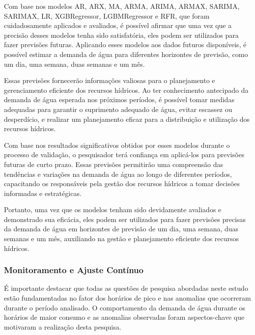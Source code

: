 Com base nos modelos AR, ARX, MA, ARMA, ARIMA, ARMAX, SARIMA, SARIMAX, LR, XGBRegressor, LGBMRegressor e RFR, que foram cuidadosamente aplicados e avaliados, é possível afirmar que uma vez que a precisão desses modelos tenha sido satisfatória, eles podem ser utilizados para fazer previsões futuras. Aplicando esses modelos aos dados futuros disponíveis, é possível estimar a demanda de água para diferentes horizontes de previsão, como um dia, uma semana, duas semanas e um mês.

Essas previsões fornecerão informações valiosas para o planejamento e gerenciamento eficiente dos recursos hídricos. Ao ter conhecimento antecipado da demanda de água esperada nos próximos períodos, é possível tomar medidas adequadas para garantir o suprimento adequado de água, evitar escassez ou desperdício, e realizar um planejamento eficaz para a distribuição e utilização dos recursos hídricos.

Com base nos resultados significativos obtidos por esses modelos durante o processo de validação, o pesquisador terá confiança em aplicá-los para previsões futuras de curto prazo. Essas previsões permitirão uma compreensão das tendências e variações na demanda de água ao longo de diferentes períodos, capacitando os responsáveis pela gestão dos recursos hídricos a tomar decisões informadas e estratégicas.

Portanto, uma vez que os modelos tenham sido devidamente avaliados e demonstrado sua eficácia, eles podem ser utilizados para fazer previsões precisas da demanda de água em horizontes de previsão de um dia, uma semana, duas semanas e um mês, auxiliando na gestão e planejamento eficiente dos recursos hídricos.

\subsubsection{Monitoramento e Ajuste Cont\'inuo}

É importante destacar que todas as questões de pesquisa abordadas neste estudo estão fundamentadas no fator dos horários de pico e nas anomalias que ocorreram durante o período analisado. O comportamento da demanda de água durante os horários de maior consumo e as anomalias observadas foram aspectos-chave que motivaram a realização desta pesquisa.

